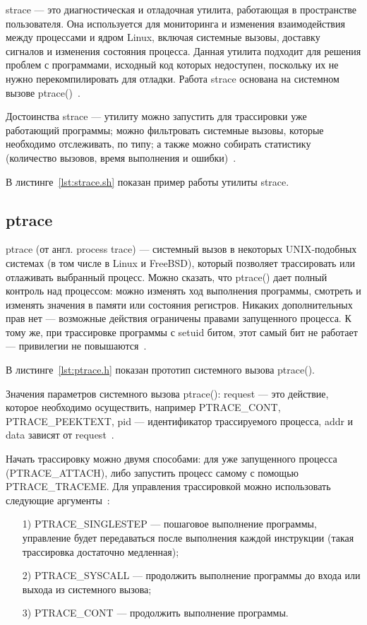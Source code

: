 \documentclass{bmstu}
\begin{document}
strace --- это диагностическая и отладочная утилита, работающая в пространстве пользователя. 
Она используется для мониторинга и изменения взаимодействия между процессами и ядром Linux, включая системные вызовы, доставку сигналов и изменения состояния процесса. 
Данная утилита подходит для решения проблем с программами, исходный код которых недоступен, поскольку их не нужно перекомпилировать для отладки. 
Работа strace основана на системном вызове ptrace()~\cite{Strace}.

Достоинства strace --- утилиту можно запустить для трассировки уже работающий программы; можно фильтровать системные вызовы, которые необходимо отслеживать, по типу; а также можно собирать статистику (количество вызовов, время выполнения и ошибки)~\cite{Strace}.

В листинге~\ref{lst:strace.sh} показан пример работы утилиты strace.


\subsection{ptrace}

ptrace (от англ. process trace) --- системный вызов в некоторых UNIX-подобных системах (в том числе в Linux и FreeBSD), который позволяет трассировать или отлаживать выбранный процесс. 
Можно сказать, что ptrace() дает полный контроль над процессом: можно изменять ход выполнения программы, смотреть и изменять значения в памяти или состояния регистров. 
Никаких дополнительных прав нет --- возможные действия ограничены правами запущенного процесса. 
К тому же, при трассировке программы с setuid битом, этот самый бит не работает --- привилегии не повышаются~\cite{Ptrace}.

В листинге~\ref{lst:ptrace.h} показан прототип системного вызова ptrace().


Значения параметров системного вызова ptrace(): request --- это действие, которое необходимо осуществить, например PTRACE\_CONT, PTRACE\_PEEKTEXT, pid --- идентификатор трассируемого процесса, addr и data зависят от request~\cite{Ptrace}.

Начать трассировку можно двумя способами: для уже запущенного процесса (PTRACE\_ATTACH), либо запустить процесс самому с помощью PTRACE\_TRACEME. 
Для управления трассировкой можно использовать следующие аргументы~\cite{Ptrace}:
\begin{enumerate}
\item[1)] PTRACE\_SINGLESTEP --- пошаговое выполнение программы, управление будет передаваться после выполнения каждой инструкции (такая трассировка достаточно медленная);
\item[2)] PTRACE\_SYSCALL --- продолжить выполнение программы до входа или выхода из системного вызова;
\item[3)] PTRACE\_CONT --- продолжить выполнение программы.
\end{enumerate}
\end{document}
